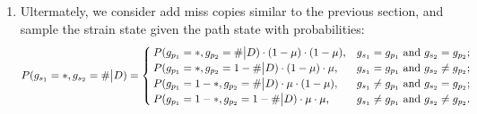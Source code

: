 \documentclass{bioinfo}
\begin{document}
\begin{methods}
\begin{enumerate}



\item
Ultermately, we consider add miss copies similar to the previous section, and sample the strain state given the path state with probabilities:
\begin{equation}
P(g_{s_1} = *, g_{s_2} = \# \big{|} D) =
\begin{cases}
P(g_{p_1} = *, g_{p_2} = \# \big{|} D) \cdot (1-\mu) \cdot (1-\mu), & g_{s_1} = g_{p_1} \text{ and } g_{s_2} = g_{p_2} ;\\
P(g_{p_1} = *, g_{p_2} = 1-\# \big{|} D) \cdot (1 - \mu) \cdot \mu, & g_{s_1} = g_{p_1} \text{ and } g_{s_2} \neq g_{p_2};\\
P(g_{p_1} = 1-*, g_{p_2} = \# \big{|} D) \cdot \mu \cdot (1 - \mu), & g_{s_1} \neq g_{p_1} \text{ and } g_{s_2} = g_{p_2};\\
P(g_{p_1} = 1-*, g_{p_2} = 1-\# \big{|} D) \cdot \mu \cdot \mu, & g_{s_1} \neq g_{p_1} \text{ and } g_{s_2} \neq g_{p_2}.
\end{cases}
\label{eqn:ps0}
\end{equation}
\end{enumerate}





\end{methods}
\end{document}
